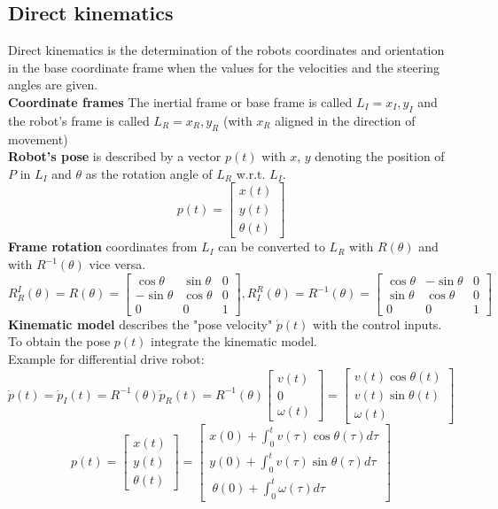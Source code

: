 \documentclass[12pt]{article}
\begin{document}
	\subsection{Direct kinematics}
	Direct kinematics is the determination of the robots coordinates and orientation in the base coordinate frame when the values for the velocities and the steering angles are given.\\
	\textbf{Coordinate frames} The inertial frame or base frame is called $L_I = {x_I, y_I}$ and the robot's frame is called $L_R = {x_R, y_R}$ (with $x_R$ aligned in the direction of movement)\\
	\textbf{Robot's pose} is described by a vector $p(t)$ with $x$, $y$ denoting the position of $P$ in $L_I$ and $\theta$ as the rotation angle of $L_R$ w.r.t. $L_I$.
	$$p(t) =
	\begin{bmatrix}
	x(t)\\
	y(t)\\
	\theta(t)
	\end{bmatrix}$$
	\textbf{Frame rotation} coordinates from $L_I$ can be converted to $L_R$ with $R(\theta)$ and with $R^{-1}(\theta)$ vice versa.
	$$R_R^I(\theta) = R(\theta) = 
	\begin{bmatrix}
	\cos \theta & \sin \theta & 0\\
	-\sin \theta & \cos \theta & 0\\
	0 & 0 & 1
	\end{bmatrix},
	R_I^R(\theta) = R^{-1}(\theta) = 
	\begin{bmatrix}
	\cos \theta & -\sin \theta & 0\\
	\sin \theta & \cos \theta & 0\\
	0 & 0 & 1
	\end{bmatrix}$$
	\textbf{Kinematic model} describes the "pose velocity" $\dot{p}(t)$ with the control inputs. To obtain the pose $p(t)$ integrate the kinematic model.\\
	Example for differential drive robot:
	$$\dot{p}(t) = \dot{p}_I(t) = R^{-1}(\theta) \dot{p}_R(t) = R^{-1}(\theta)
	\begin{bmatrix}
	v(t)\\
	0\\
	\omega(t)
	\end{bmatrix} = 
	\begin{bmatrix}
	v(t) \cos \theta(t)\\
	v(t) \sin \theta(t)\\
	\omega(t)
	\end{bmatrix}$$
	$$p(t) = 
	\begin{bmatrix}
	x(t)\\
	y(t)\\
	\theta(t)
	\end{bmatrix} = 
	\begin{bmatrix}
	x(0) + \int_{0}^{t} v(\tau) \cos \theta(\tau) d \tau\\
	y(0) + \int_{0}^{t} v(\tau) \sin \theta(\tau) d \tau\\\
	\theta(0) + \int_{0}^{t} \omega(\tau) d \tau
	\end{bmatrix}$$
	
\end{document}

